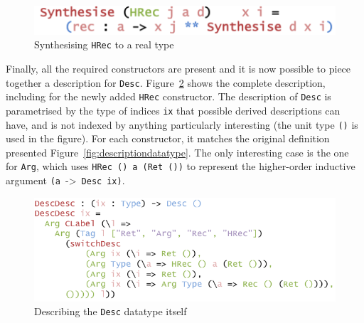 \documentclass{ituthesis}
\newcommand{\ttconstructor}[1]{\textcolor{constructor-color}{\texttt{#1}}}
\newcommand{\tttype}[1]{\textcolor{type-color}{\texttt{#1}}}
\newcommand{\ttvar}[1]{\textcolor{local-var-color}{\texttt{#1}}}
\theoremstyle{definition}
\begin{document}
\begin{figure}[ht]
\begin{center}
    \includegraphics[scale=0.5]{Figures/SynthesisingDataExtended.png}
\end{center}
\caption{Synthesising \ttconstructor{HRec} to a real type}
\label{fig:synthhrec}
\end{figure}

Finally, all the required constructors are present and it is now possible to piece together a description for \tttype{Desc}. Figure~\ref{fig:descdesc} shows the complete description, including for the newly added
\ttconstructor{HRec} constructor. The description of \tttype{Desc} is parametrised by the type of indices \ttvar{ix} that possible derived descriptions can have, and is not indexed by anything particularly interesting (the unit type \tttype{()} is used in the figure).
For each constructor, it matches the original definition presented Figure~\ref{fig:descriptiondatatype}. The only interesting case is the one for \ttconstructor{Arg}, which uses \ttconstructor{HRec ()}~\ttvar{a}~\texttt{(}\ttconstructor{Ret ()}\texttt{)} to represent the higher-order inductive argument \texttt{(}\ttvar{a}~->~\tttype{Desc}~\ttvar{ix}\texttt{)}.

\begin{figure}[ht]
\begin{center}
    \includegraphics[scale=0.5]{Figures/DescriptionDescription.png}
\end{center}
\caption{Describing the \tttype{Desc} datatype itself}
\label{fig:descdesc}
\end{figure}
\end{document}
